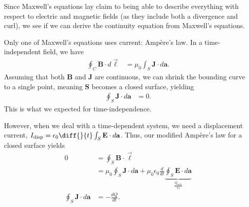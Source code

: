 \documentclass[10pt]{mypackage}
\begin{document}
Since Maxwell's equations lay claim to being able to describe everything with respect to electric and magnetic fields (as they include both a divergence and curl), we see if we can derive the continuity equation from Maxwell's equations.\newline

Only one of Maxwell's equations uses current: Ampère's law. In a time-independent field, we have
\begin{align*}
  \oint_{C} \mathbf{B}\cdot d\vec{\ell} &= \mu_0\int_{S}^{} \mathbf{J}\cdot d\mathbf{a}.
\end{align*}
Assuming that both $\mathbf{B}$ and $\mathbf{J}$ are continuous, we can shrink the bounding curve to a single point, meaning $\mathbf{S}$ becomes a closed surface, yielding
\begin{align*}
  \oint_{S}\mathbf{J}\cdot d\mathbf{a}&= 0.
\end{align*}
This is what we expected for time-independence.\newline

However, when we deal with a time-dependent system, we need a displacement current, $I_{\text{disp}} = \epsilon_0\diff{}{t}\int_{S}\mathbf{E}\cdot d\mathbf{a}$. Thus, our modified Ampère's law for a closed surface yields
\begin{align*}
  0 &= \oint_{S}\mathbf{B}\cdot \vec{\ell}\\
    &= \mu_0\oint_{S}\mathbf{J}\cdot d\mathbf{a} + \mu_0\epsilon_0\frac{d}{dt}\underbrace{\oint_{S}\mathbf{E}\cdot d\mathbf{a}}_{\frac{Q_{\text{encl}}}{\epsilon_0}}\\
  \oint_{S}\mathbf{J}\cdot d\mathbf{a} &= -\frac{dQ}{dt}.
\end{align*}
\end{document}
